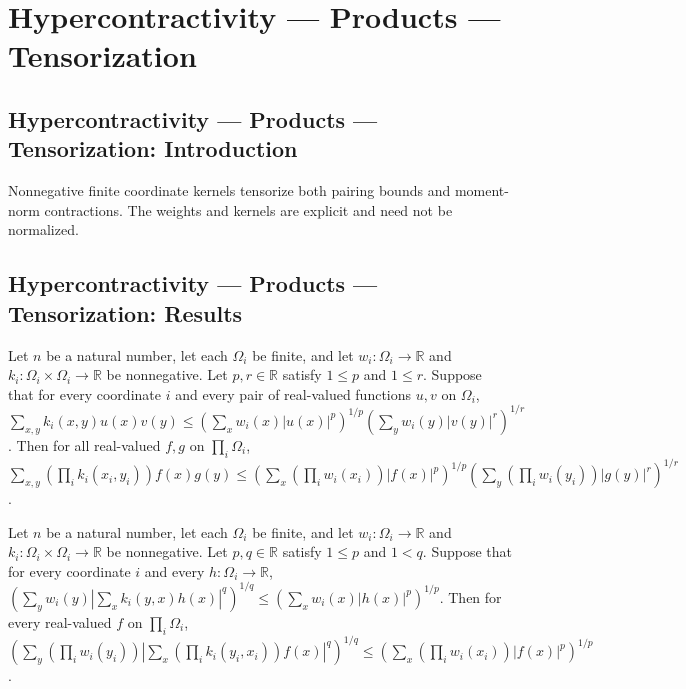 \section{Hypercontractivity --- Products --- Tensorization}
\subsection*{Hypercontractivity --- Products --- Tensorization: Introduction}
Nonnegative finite coordinate kernels tensorize both pairing bounds and moment-norm contractions. The weights and kernels are explicit and need not be normalized.

\subsection*{Hypercontractivity --- Products --- Tensorization: Results}

\begin{theorem}
\leanok
{}
Let $n$ be a natural number, let each $\Omega_i$ be finite, and let
$w_i:\Omega_i\to\mathbb R$ and $k_i:\Omega_i\times\Omega_i\to\mathbb R$ be nonnegative.
Let $p,r\in\mathbb R$ satisfy $1\le p$ and $1\le r$. Suppose that for every coordinate
$i$ and every pair of real-valued functions $u,v$ on $\Omega_i$,
$\sum_{x,y}k_i(x,y)u(x)v(y)\le\left(\sum_xw_i(x)|u(x)|^p\right)^{1/p}\left(\sum_yw_i(y)|v(y)|^r\right)^{1/r}$.
Then for all real-valued $f,g$ on $\prod_i\Omega_i$, $\sum_{x,y}\left(\prod_i
k_i(x_i,y_i)\right)f(x)g(y)\le\left(\sum_x\left(\prod_iw_i(x_i)\right)|f(x)|^p\right)^{1/p}\left(\sum_y\left(\prod_iw_i(y_i)\right)|g(y)|^r\right)^{1/r}$.
\end{theorem}

\begin{theorem}
\leanok
{}
Let $n$ be a natural number, let each $\Omega_i$ be finite, and let
$w_i:\Omega_i\to\mathbb R$ and $k_i:\Omega_i\times\Omega_i\to\mathbb R$ be nonnegative.
Let $p,q\in\mathbb R$ satisfy $1\le p$ and $1<q$. Suppose that for every coordinate $i$
and every $h:\Omega_i\to\mathbb R$, $\left(\sum_y w_i(y)\left|\sum_x
k_i(y,x)h(x)\right|^q\right)^{1/q}\le\left(\sum_xw_i(x)|h(x)|^p\right)^{1/p}$. Then for
every real-valued $f$ on $\prod_i\Omega_i$,
$\left(\sum_y\left(\prod_iw_i(y_i)\right)\left|\sum_x\left(\prod_i
k_i(y_i,x_i)\right)f(x)\right|^q\right)^{1/q}\le\left(\sum_x\left(\prod_iw_i(x_i)\right)|f(x)|^p\right)^{1/p}$.
\end{theorem}
